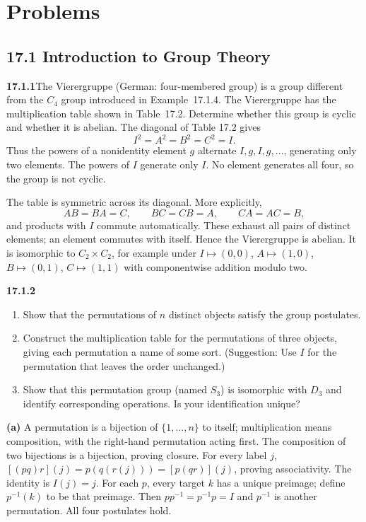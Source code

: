 
\section*{Problems}

\subsection*{17.1 Introduction to Group Theory}

\par\bigskip
\noindent\textbf{17.1.1}\quad The Vierergruppe (German: four-membered
group) is a group different from the $C_{4}$ group introduced in
Example~17.1.4. The Vierergruppe has the multiplication table shown
in Table~17.2. Determine whether this group is cyclic and whether it
is abelian.
\solution
The diagonal of Table 17.2 gives
\[
I^2=A^2=B^2=C^2=I.
\]
Thus the powers of a nonidentity element $g$ alternate
$I,g,I,g,\ldots$, generating only two elements. The powers of $I$
generate only $I$. No element generates all four, so the group
is $\boxed{\text{not cyclic}}$.

The table is symmetric across its diagonal. More explicitly,
\[
AB=BA=C,\qquad BC=CB=A,\qquad CA=AC=B,
\]
and products with $I$ commute automatically. These exhaust all
pairs of distinct elements; an element commutes with itself.
Hence the Vierergruppe is $\boxed{\text{abelian}}$.
It is isomorphic to $C_2\times C_2$, for example under
$I\mapsto(0,0)$, $A\mapsto(1,0)$, $B\mapsto(0,1)$,
$C\mapsto(1,1)$ with componentwise addition modulo two.

\par\bigskip
\noindent\textbf{17.1.2}
\begin{enumerate}
\item[(a)] Show that the permutations of $n$ distinct objects satisfy
the group postulates.
\item[(b)] Construct the multiplication table for the permutations of
three objects, giving each permutation a name of some sort.
(Suggestion: Use $I$ for the permutation that leaves the order
unchanged.)
\item[(c)] Show that this permutation group (named $S_{3}$) is
isomorphic with $D_{3}$ and identify corresponding operations. Is
your identification unique?
\end{enumerate}
\solution
\textbf{(a)} A permutation is a bijection of
$\{1,\ldots,n\}$ to itself; multiplication means composition,
with the right-hand permutation acting first.
The composition of two bijections is a bijection, proving closure.
For every label $j$,
$[(pq)r](j)=p(q(r(j)))=[p(qr)](j)$, proving associativity.
The identity is $I(j)=j$.
For each $p$, every target $k$ has a unique preimage; define $p^{-1}(k)$
to be that preimage. Then $pp^{-1}=p^{-1}p=I$ and $p^{-1}$
is another permutation. All four postulates hold.

